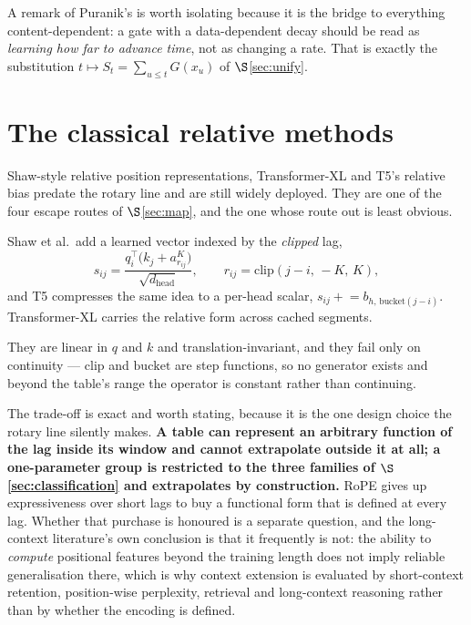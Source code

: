 \documentclass[11pt]{article}
\newcommand{\hd}{d_{\mathrm{head}}}
\begin{document}
\noindent A remark of Puranik's is worth isolating because it is the bridge to
everything content-dependent: a gate with a data-dependent decay should be read as
\emph{learning how far to advance time}, not as changing a rate. That is exactly
the substitution $t \mapsto S_t = \sum_{u\le t}G(x_u)$ of $\S$\ref{sec:unify}.


\section{The classical relative methods}
\label{sec:classical}

Shaw-style relative position representations, Transformer-XL and T5's relative bias
predate the rotary line and are still widely deployed. They are one of the four escape routes of
$\S$\ref{sec:map}, and the one whose route out is least obvious.

Shaw et al.\ add a learned vector indexed by the \emph{clipped} lag,
\[
  s_{ij} = \frac{q_i^{\!\top}\big(k_j + a^K_{r_{ij}}\big)}{\sqrt{\hd}},
  \qquad r_{ij} = \mathrm{clip}(j-i,\,-K,\,K),
\]
and T5 compresses the same idea to a per-head scalar,
$s_{ij} \mathrel{+}= b_{h,\,\mathrm{bucket}(j-i)}$. Transformer-XL carries the
relative form across cached segments.

They are linear in $q$ and $k$ and translation-invariant, and they fail only on
continuity --- $\mathrm{clip}$ and $\mathrm{bucket}$ are step functions, so no
generator exists and beyond the table's range the operator is constant rather than
continuing.

The trade-off is exact and worth stating, because it is the one design choice the
rotary line silently makes. \textbf{A table can represent an arbitrary function of
the lag inside its window and cannot extrapolate outside it at all; a one-parameter
group is restricted to the three families of $\S$\ref{sec:classification} and
extrapolates by construction.} RoPE gives up expressiveness over short lags to buy
a functional form that is defined at every lag. Whether that purchase is honoured is
a separate question, and the long-context literature's own conclusion is that it
frequently is not: the ability to \emph{compute} positional features beyond the
training length does not imply reliable generalisation there, which is why context
extension is evaluated by short-context retention, position-wise perplexity,
retrieval and long-context reasoning rather than by whether the encoding is defined.
\end{document}
